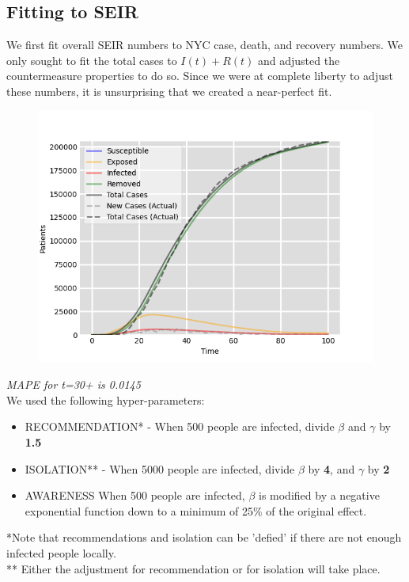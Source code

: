 \documentclass[12pt, a4, epsf] {article}
\theoremstyle{plain}
\theoremstyle{definition}
\begin{document}
\subsection{Fitting to SEIR}
We first fit overall SEIR numbers to NYC case, death, and recovery numbers. We only sought to fit the total cases to $I(t) + R(t)$ and adjusted the countermeasure properties to do so. Since we were at complete liberty to adjust these numbers, it is unsurprising that we created a near-perfect fit.\\
\begin{figure}[htbp]
\includegraphics[width = 1.0\textwidth]{Scratch_Visuals/SEIR_Curve_NYC_3.png}
\end{figure}
\FloatBarrier
\textit{MAPE for t=30+ is 0.0145}\\
We used the following hyper-parameters:\\
\begin{itemize}
    \item RECOMMENDATION* - When 500 people are infected, divide $\beta$ and $\gamma$ by \textbf{1.5}
    \item ISOLATION** - When 5000 people are infected, divide $\beta$ by \textbf{4}, and $\gamma$ by \textbf{2}
    \item AWARENESS When 500 people are infected, $\beta$ is modified by a negative exponential function down to a minimum of 25\% of the original effect.
\end{itemize}
*Note that recommendations and isolation can be 'defied' if there are not enough infected people locally.\\
** Either the adjustment for recommendation or for isolation will take place.\\
\end{document}
